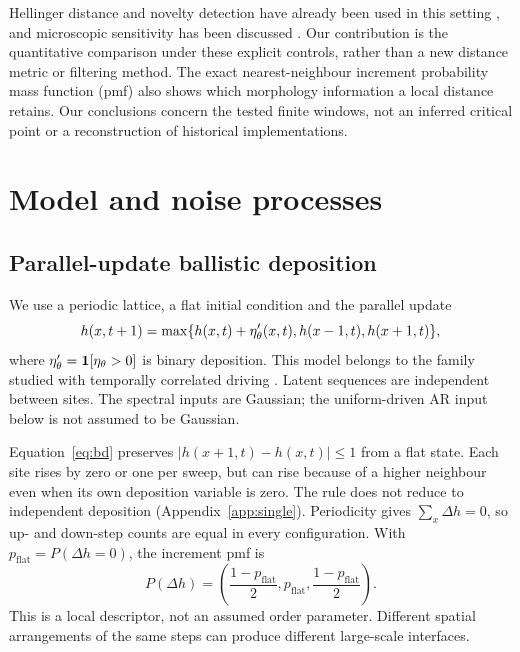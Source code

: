 Hellinger distance and novelty detection have already been used in this
setting \cite{WangXia2025}, and microscopic sensitivity has been discussed
\cite{RodriguezFernandez2024}. Our contribution is the quantitative comparison
under these explicit controls, rather than a new distance metric or filtering
method. The exact nearest-neighbour increment probability mass function (pmf)
also shows which morphology information a local distance retains. Our
conclusions concern the tested finite windows, not an inferred critical point
or a reconstruction of historical implementations.

\section{Model and noise processes}
\label{sec:model}
\subsection{Parallel-update ballistic deposition}
We use a periodic lattice, a flat initial condition and the parallel update
\begin{equation}
 h(x,t+1)=\max\{h(x,t)+\eta'_{\theta}(x,t),h(x-1,t),h(x+1,t)\},
 \label{eq:bd}
\end{equation}
where $\eta'_{\theta}=\mathbf1[\eta_\theta>0]$ is binary deposition. This model belongs
to the family studied with temporally correlated driving
\cite{Lam1992,AlesLopez2019,JiangXia2026}. Latent sequences are independent
between sites. The spectral inputs are Gaussian; the uniform-driven AR input
below is not assumed to be Gaussian.

Equation~\eqref{eq:bd} preserves $|h(x+1,t)-h(x,t)|\le1$ from a flat state.
Each site rises by zero or one per sweep, but can rise because of a higher
neighbour even when its own deposition variable is zero. The rule does not
reduce to independent deposition (Appendix~\ref{app:single}). Periodicity
gives $\sum_x\Delta h=0$, so up- and down-step counts are equal in every
configuration. With $p_{\mathrm{flat}}=P(\Delta h=0)$, the increment pmf is
\begin{equation}
 P(\Delta h)=\left(\frac{1-p_{\mathrm{flat}}}{2},p_{\mathrm{flat}},
                   \frac{1-p_{\mathrm{flat}}}{2}\right).
 \label{eq:pmf}
\end{equation}
This is a local descriptor, not an assumed order parameter. Different spatial
arrangements of the same steps can produce different large-scale interfaces.


